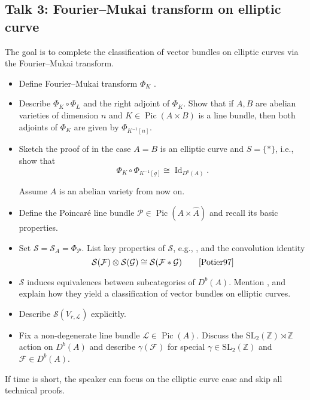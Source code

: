 \documentclass[UTF8]{amsart}
\numberwithin{equation}{section}
\theoremstyle{plain}
\numberwithin{equation}{section}
\theoremstyle{remark}
\DeclareMathOperator{\Id}{\operatorname{Id}}	%
\DeclareMathOperator{\Pic}{\operatorname{Pic}}
\begin{document}
\subsection*{Talk 3: Fourier--Mukai transform on elliptic curve}

The goal is to complete the classification of vector bundles on elliptic curves via the Fourier--Mukai transform.

\begin{itemize}
\item Define Fourier--Mukai transform $\Phi_K$ \cite[Chapter 11]{Potier97}.
\item Describe $\Phi_K \circ \Phi_L$ and the right adjoint of $\Phi_K$. Show that if $A, B$ are abelian varieties of dimension $n$ and $K \in \Pic(A \times B)$ is a line bundle, then both adjoints of $\Phi_K$ are given by $\Phi_{K^{-1}[n]}$.
\item Sketch the proof of \cite[Theorem 11.4]{Potier97} in the case $A = B$ is an elliptic curve and $S = \{*\}$, i.e., show that 
$$\Phi_K \circ \Phi_{K^{-1}[g]} \cong \Id_{D^b(A)}.$$

\noindent \hspace{-8mm}Assume $A$ is an abelian variety from now on.

\item Define the Poincaré line bundle $\mathcal{P} \in \Pic(A \times \hat{A})$ and recall its basic properties.
\item Set $\mathcal{S} = \mathcal{S}_A = \Phi_{\mathcal{P}}$. List key properties of $\mathcal{S}$, e.g., \cite[(11.3.1)–(11.3.4), Theorem 11.6]{Potier97}, and the convolution identity
$$\mathcal{S}(\mathcal{F}) \otimes \mathcal{S}(\mathcal{G}) \cong \mathcal{S}(\mathcal{F}*\mathcal{G}) \qquad \text{\cite[p141]{Potier97}}$$

\item  $\mathcal{S}$ induces equivalences between subcategories of $D^b(A)$. Mention \cite[Proposition 11.8, Lemma 14.6, Theorem 14.7]{Potier97}, and explain how they yield a classification of vector bundles on elliptic curves.
\item Describe $\mathcal{S}(V_{r,\mathcal{L}})$ explicitly.
\item Fix a non-degenerate line bundle $\mathcal{L} \in \Pic(A)$. Discuss the $\mathrm{SL}_2(\mathbb{Z}) \rtimes \mathbb{Z}$ action on $D^b(A)$ and describe $\gamma(\mathcal{F})$ for special $\gamma \in \mathrm{SL}_2(\mathbb{Z})$ and $\mathcal{F} \in D^b(A)$.
\end{itemize}
If time is short, the speaker can focus on the elliptic curve case and skip all technical proofs.
\end{document}
